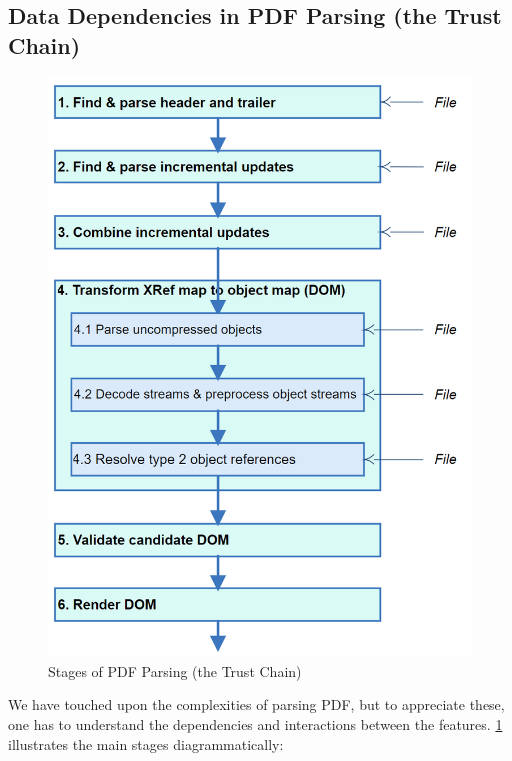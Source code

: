 \subsection{Data Dependencies in PDF Parsing (the Trust Chain)}
\label{sec:trust-chain}

\begin{figure}[t]
  \centering
  \includegraphics[width=0.8\linewidth]{figures/Stages.png}
  \caption{Stages of PDF Parsing (the Trust Chain)}
  \label{fig:pdf-trust-chain}
\end{figure}

We have touched upon the complexities of parsing
PDF, but to appreciate these, one has to understand the
dependencies and interactions between the features.
\cref{fig:pdf-trust-chain} illustrates the main stages diagrammatically:

